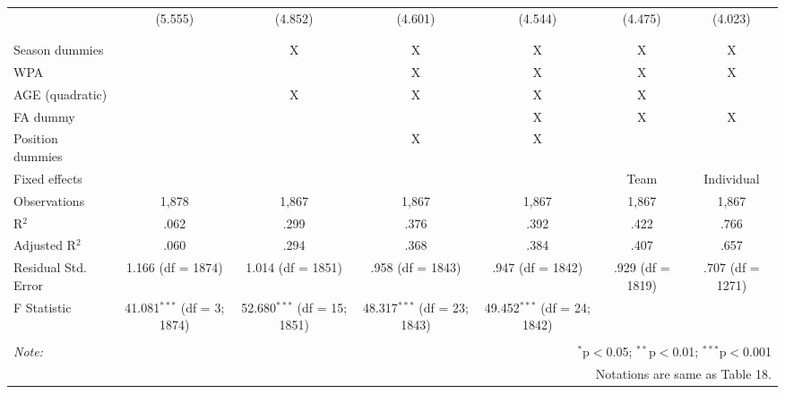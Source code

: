 \begin{table}[H]
\begin{tabular}{@{\extracolsep{5pt}}lcccccc}
  & (5.555) & (4.852) & (4.601) & (4.544) & (4.475) & (4.023) \\
  & & & & & & \\
\hline \\[-1.8ex]
Season dummies &  & X & X & X & X & X \\
WPA & & & X & X & X & X \\
AGE (quadratic) &  & X & X & X & X &  \\
FA dummy &  &  &  & X & X & X \\
Position dummies &  &  & X & X &  &  \\
Fixed effects &  &  &  &  & Team & Individual \\
Observations & 1,878 & 1,867 & 1,867 & 1,867 & 1,867 & 1,867 \\
R$^{2}$ & .062 & .299 & .376 & .392 & .422 & .766 \\
Adjusted R$^{2}$ & .060 & .294 & .368 & .384 & .407 & .657 \\
Residual Std. Error & 1.166 (df = 1874) & 1.014 (df = 1851) & .958 (df = 1843) & .947 (df = 1842) & .929 (df = 1819) & .707 (df = 1271) \\
F Statistic & 41.081$^{***}$ (df = 3; 1874) & 52.680$^{***}$ (df = 15; 1851) & 48.317$^{***}$ (df = 23; 1843) & 49.452$^{***}$ (df = 24; 1842) &  &  \\
\hline
\hline \\[-1.8ex]
\textit{Note:}  & \multicolumn{6}{r}{$^{*}$p$<$0.05; $^{**}$p$<$0.01; $^{***}$p$<$0.001} \\
& \multicolumn{6}{r}{Notations are same as Table 18.} \\
\end{tabular}
\end{table}
